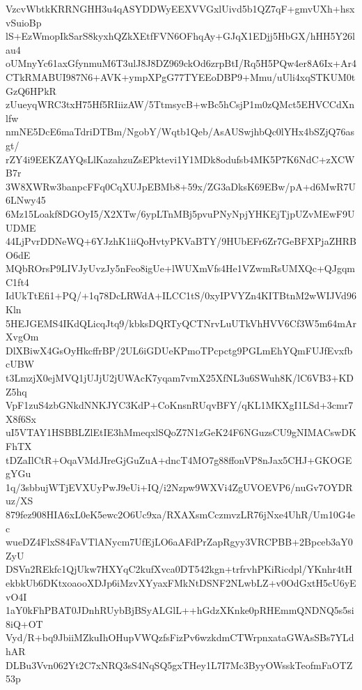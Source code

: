 VzcvWbtkKRRNGHH3u4qASYDDWyEEXVVGxlUivd5b1QZ7qF+gmvUXh+hsxvSuioBp
lS+EzWmopIkSarS8kyxhQZkXEtfFVN6OFhqAy+GJqX1EDjj5HbGX/hHH5Y26lau4
oUMnyYc61axGfynmuM6T3ulJ8J8DZ969ckOd6zrpBtI/Rq5H5PQw4er8A6Ix+Ar4
CTkRMABUI987N6+AVK+ympXPgG77TYEEoDBP9+Mmu/uUli4xqSTKUM0tGzQ6HPkR
zUueyqWRC3txH75Hf5RIiizAW/5TtmsycB+wBc5hCsjP1m0zQMct5EHVCCdXnlfw
nmNE5DcE6maTdriDTBm/NgobY/Wqtb1Qeb/AsAUSwjhbQc0lYHx4bSZjQ76asgt/
rZY4i9EEKZAYQsLlKazahzuZsEPktevi1Y1MDk8odufsb4MK5P7K6NdC+zXCWB7r
3W8XWRw3banpcFFq0CqXUJpEBMb8+59x/ZG3aDksK69EBw/pA+d6MwR7U6LNwy45
6Mz15Loakf8DGOyI5/X2XTw/6ypLTnMBj5pvuPNyNpjYHKEjTjpUZvMEwF9UUDME
44LjPvrDDNeWQ+6YJzhK1iiQoHvtyPKVaBTY/9HUbEFr6Zr7GeBFXPjaZHRBO6dE
MQbROrsP9LIVJyUvzJy5nFeo8igUe+lWUXmVfs4He1VZwmRsUMXQc+QJgqmC1ft4
IdUkTtEfi1+PQ/+1q78DcLRWdA+ILCC1tS/0xyIPVYZn4KITBtnM2wWIJVd96Kln
5HEJGEMS4IKdQLicqJtq9/kbksDQRTyQCTNrvLuUTkVhHVV6Cf3W5m64mArXvgOm
DlXBiwX4GsOyHkcffrBP/2UL6iGDUeKPmoTPcpctg9PGLmEhYQmFUJfEvxfbcUBW
t3LmzjX0ejMVQ1jUJjU2jUWAcK7yqam7vmX25XfNL3u6SWuh8K/lC6VB3+KDZ5hq
VpF1zuS4zbGNkdNNKJYC3KdP+CoKnsnRUqvBFY/qKL1MKXgI1LSd+3cmr7X8f6Sx
uI5VTAY1HSBBLZlEtIE3hMmeqxlSQoZ7N1zGeK24F6NGuzsCU9gNIMACswDKFhTX
tDZaIlCtR+OqaVMdJIreGjGuZuA+dncT4MO7g88ffonVP8nJax5CHJ+GKOGEgYGu
1q/3sbbujWTjEVXUyPwJ9eUi+IQ/i2Nzpw9WXVi4ZgUVOEVP6/nuGv7OYDRuz/XS
879fez908HIA6xL0eK5ewc2O6Uc9xa/RXAXsmCczmvzLR76jNxe4UhR/Um10G4ec
wueDZ4FlxS84FaVTlANycm7UfEjLO6aAFdPrZapRgyy3VRCPBB+2Bpceb3aY0ZyU
DSVn2REkfc1QjUkw7HXYqC2kufXvca0DT542kgn+trfrvhPKiRicdpl/YKnhr4tH
ekbkUb6DKtxoaooXDJp6iMzvXYyaxFMkNtDSNF2NLwbLZ+v0OdGxtH5cU6yEvO4I
1aY0kFhPBAT0JDnhRUybBjBSyALGlL++hGdzXKnke0pRHEmmQNDNQ5s5si8iQ+OT
Vyd/R+bq9JbiiMZkuIhOHupVWQzfsFizPv6wzkdmCTWrpnxataGWAsSBs7YLdhAR
DLBu3Vvn062Yt2C7xNRQ3sS4NqSQ5gxTHey1L7I7Mc3ByyOWsskTeofmFaOTZ53p
